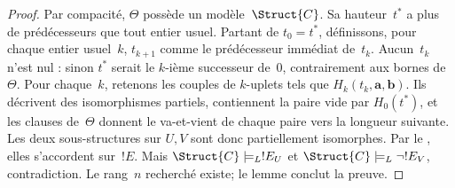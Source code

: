 \documentclass[../../../include/open-logic-section]{subfiles}
\begin{document}
\begin{proof}
Par compacité, $\Theta$ possède
un modèle~$\Struct{C}$. Sa
hauteur~$t^*$ a plus de
prédécesseurs que tout entier
usuel. Partant de
$t_0=t^*$, définissons, pour
chaque entier usuel~$k$,
$t_{k+1}$ comme le prédécesseur
immédiat de~$t_k$.
Aucun~$t_k$ n'est nul : sinon
$t^*$ serait le $k$-ième
successeur de~$0$, contrairement
aux bornes de~$\Theta$.
Pour chaque~$k$, retenons les
couples de $k$-uplets tels que
$H_k(t_k,\mathbf a,\mathbf b)$.
Ils décrivent des isomorphismes
partiels, contiennent la paire
vide par $H_0(t^*)$, et les
clauses de~$\Theta$ donnent
le va-et-vient de chaque paire
vers la longueur suivante.
Les deux sous-structures sur
$U,V$ sont donc partiellement
isomorphes. Par le
,
elles s'accordent sur~$!E$.
Mais $\Struct{C}\models_L !E_U$
et $\Struct{C}\models_L\lnot !E_V$,
contradiction. Le rang~$n$
recherché existe; le lemme
conclut la preuve.
\end{proof}
\end{document}
